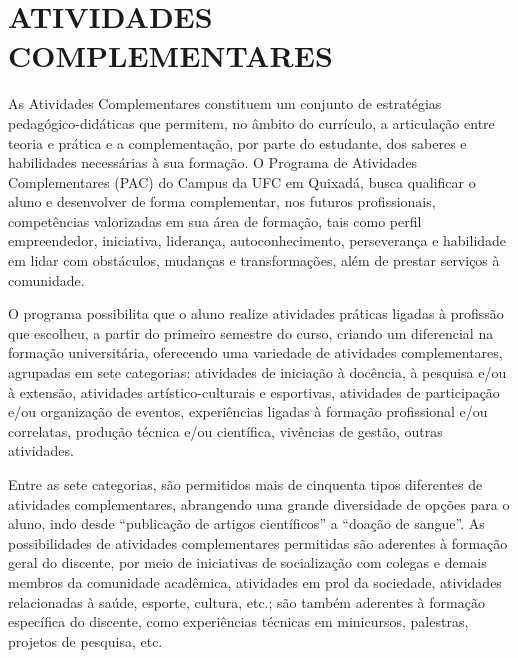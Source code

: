 \chapter{ATIVIDADES COMPLEMENTARES}
\label{cap:atividades-complementares}

As Atividades Complementares constituem um conjunto de estratégias pedagógico-didáticas que permitem, no âmbito do currículo, a articulação entre teoria e prática e a complementação, por parte do estudante, dos saberes e habilidades necessárias à sua formação. O Programa de Atividades Complementares (PAC) do Campus da UFC em Quixadá, busca qualificar o aluno e desenvolver de forma complementar, nos futuros profissionais, competências valorizadas em sua área de formação, tais como perfil empreendedor, iniciativa, liderança, autoconhecimento, perseverança e habilidade em lidar com obstáculos, mudanças e transformações, além de prestar serviços à comunidade.

O programa possibilita que o aluno realize atividades práticas ligadas à profissão que escolheu, a partir do primeiro semestre do curso, criando um diferencial na formação universitária, oferecendo uma variedade de atividades complementares, agrupadas em sete categorias: atividades de iniciação à docência, à pesquisa e/ou à extensão, atividades artístico-culturais e esportivas, atividades de participação e/ou organização de eventos, experiências ligadas à formação profissional e/ou correlatas, produção técnica e/ou científica, vivências de gestão, outras atividades.

Entre as sete categorias, são permitidos mais de cinquenta tipos diferentes de atividades complementares, abrangendo uma grande diversidade de opções para o aluno, indo desde “publicação de artigos científicos” a “doação de sangue”. As possibilidades de atividades complementares permitidas são aderentes à formação geral do discente, por meio de iniciativas de socialização com colegas e demais membros da comunidade acadêmica, atividades em prol da sociedade, atividades relacionadas à saúde, esporte, cultura, etc.; são também aderentes à formação específica do discente, como experiências técnicas em minicursos, palestras, projetos de pesquisa, etc.

